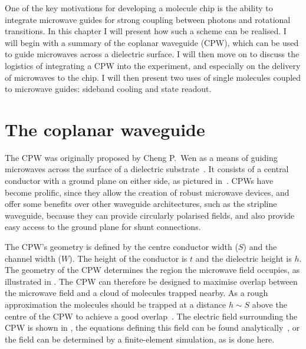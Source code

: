 One of the key motivations for developing a molecule chip is the ability to
integrate microwave guides for strong coupling between photons and rotational
transitions. In this chapter I will present how such a scheme can be realised.
I will begin with a summary of the coplanar waveguide (CPW), which can be used
to guide microwaves across a dielectric surface. I will then move on to discuss
the logistics of integrating a CPW into the experiment, and especially on the
delivery of microwaves to the chip. I will then present two uses of single
\CaF{} molecules coupled to microwave guides: sideband cooling and state
readout.

\section{The coplanar waveguide}

The CPW was originally proposed by Cheng P.~Wen as a means
of guiding microwaves across the surface of a dielectric
substrate~\cite{1127105}. It consists of a central conductor with a ground
plane on either side, as pictured in~. CPWs have become
prolific, since they allow the creation of robust microwave devices, and offer
some benefits over other waveguide architectures, such as the stripline
waveguide, because they can provide circularly polarised fields, and also
provide easy access to the ground plane for shunt connections.

The CPW's geometry is defined by the centre conductor width ($S$) and the
channel width ($W$). The height of the conductor is $t$ and the dielectric
height is $h$.  The geometry of the CPW determines the region the microwave
field occupies, as illustrated in .  The CPW
can therefore be designed to maximise overlap between the microwave field and a
cloud of molecules trapped nearby.  As a rough approximation the molecules
should be trapped at a distance $h\sim S$ above the centre of the CPW to
achieve a good overlap~\cite{Boehi2009}. The electric field surrounding the CPW is shown
in , the equations defining this field can be found
analytically~\cite{Simons2004}, or the field can be determined by a
finite-element simulation, as is done here.

